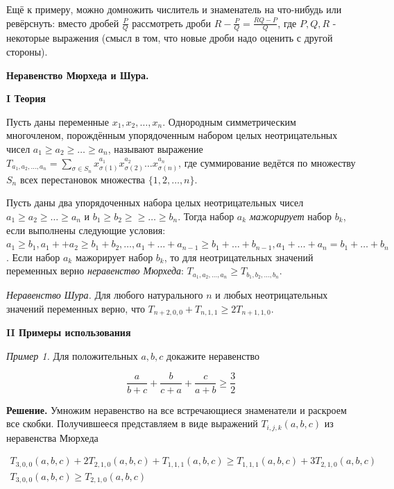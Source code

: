 Ещё к примеру, можно домножить числитель и знаменатель на что-нибудь или ревёрснуть: вместо дробей $\frac{P}{Q}$ рассмотреть дроби $R-\frac{P}{Q}=\frac{R Q-P}{Q}$, где $P, Q, R$ - некоторые выражения (смысл в том, что новые дроби надо оценить с другой стороны).

\textbf{\Large Неравенство Мюрхеда и Шура.}

\textbf{I Теория}

Пусть даны переменные $x_1, x_2, \ldots, x_n$. Однородным симметрическим многочленом, порождённым упорядоченным набором целых неотрицательных чисел $a_1 \geqslant a_2 \geqslant \ldots \geqslant a_n$, называют выражение $T_{a_1, a_2, \ldots, a_n}=\sum_{\sigma \in S_n} x_{\sigma(1)}^{a_1} x_{\sigma(2)}^{a_2} \ldots x_{\sigma(n)}^{a_n}$, где суммирование ведётся по множеству $S_n$ всех перестановок множества $\{1,2, \ldots, n\}$.

Пусть даны два упорядоченных набора целых неотрицательных чисел $a_1 \geqslant a_2 \geqslant \ldots \geqslant a_n$ и $b_1 \geqslant b_2 \geqslant \geqslant \ldots \geqslant b_n$. Тогда набор $a_k$ \textit{мажорирует} набор $b_k$, если выполнены следующие условия: $a_1 \geqslant b_1, a_1+ +a_2 \geqslant b_1+b_2, \ldots, a_1+\ldots+a_{n-1} \geqslant b_1+\ldots+b_{n-1}, a_1+\ldots+a_n=b_1+\ldots+b_n$. Если набор $a_k$ мажорирует набор $b_k$, то для неотрицательных значений переменных верно \textit{неравенство Мюрхеда}: $T_{a_1, a_2, \ldots, a_n} \geqslant T_{b_1, b_2, \ldots, b_n}$.


\textit{Неравенство Шура.}
Для любого натурального $n$ и любых неотрицательных значений переменных верно, что $T_{n+2,0,0}+T_{n, 1,1} \geqslant 2 T_{n+1,1,0}$. 


\textbf{II Примеры использования}

\textit{Пример 1.}
Для положительных $a, b, c$ докажите неравенство

$$
\frac{a}{b+c}+\frac{b}{c+a}+\frac{c}{a+b} \geqslant \frac{3}{2}
$$

\textbf{Решение.}
Умножим неравенство на все встречающиеся знаменатели и раскроем все скобки. Получившееся представляем в виде выражений $T_{i, j, k}(a, b, c)$ из неравенства Мюрхеда

$$
\begin{gathered}
T_{3,0,0}(a, b, c)+2 T_{2,1,0}(a, b, c)+T_{1,1,1}(a, b, c) \geqslant T_{1,1,1}(a, b, c)+3 T_{2,1,0}(a, b, c) \\
T_{3,0,0}(a, b, c) \geqslant T_{2,1,0}(a, b, c)
\end{gathered}
$$


